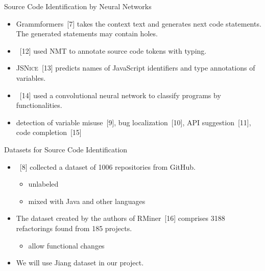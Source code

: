 \documentclass[xcolor=svgnames]{beamer}
\begin{document}
\begin{frame}{Source Code Identification by Neural Networks}


\begin{itemize}
\item  Grammformers~[7] takes the context text and generates next code statements. The generated statements may contain holes.

\item {}~[12] used NMT to annotate source code tokens with typing.

\item \textsc{JSNice}~[13] predicts names of JavaScript identifiers and type annotations of variables.

\item {}~[14] used a convolutional neural network to classify programs by functionalities.

\item detection of variable misuse~[9],
bug localization~[10],
API suggestion~[11],
code completion~[15]
\end{itemize}
\end{frame}

\begin{frame}{Datasets for Source Code Identification}
\begin{itemize}
\item {}~[8] collected a dataset of \num{1006} repositories from GitHub.
\begin{itemize}
\item unlabeled
\item mixed with Java and other languages
\end{itemize}

\item The dataset created by the authors of RMiner~[16] comprises \num{3188} refactorings found from 185 projects.
\begin{itemize}
\item allow functional changes
\end{itemize}

\item We will use Jiang dataset in our project.
\end{itemize}

\end{frame}
\end{document}
